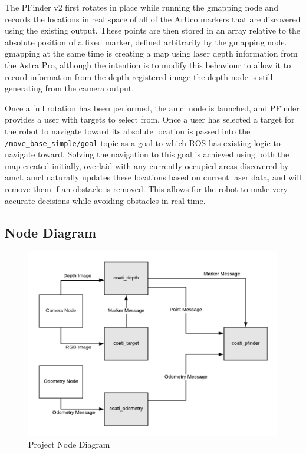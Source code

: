 \documentclass{article}[12]
\begin{document}
	The PFinder v2 first rotates in place while running the gmapping node and records the locations in real space of all of the ArUco markers that are discovered using the existing output. These points are then stored in an array relative to the absolute position of a fixed marker, defined arbitrarily by the gmapping node. gmapping at the same time is creating a map using laser depth information from the Astra Pro, although the intention is to modify this behaviour to allow it to record information from the depth-registered image the depth node is still generating from the camera output.
	
	Once a full rotation has been performed, the amcl node is launched, and PFinder provides a user with targets to select from. Once a user has selected a target for the robot to navigate toward its absolute location is passed into the \texttt{/move\_base\_simple/goal} topic as a goal to which ROS has existing logic to navigate toward. Solving the navigation to this goal is achieved using both the map created initially, overlaid with any currently occupied areas discovered by amcl. amcl naturally updates these locations based on current laser data, and will remove them if an obstacle is removed. This allows for the robot to make very accurate decisions while avoiding obstacles in real time. 
	
	\subsection{Node Diagram}

	\begin{figure}[H]
		\centering
		\includegraphics[width=0.8\linewidth]{NodeDiagram}
		\caption{Project Node Diagram}
		\label{fig:nodediagram}
	\end{figure}
\end{document}
